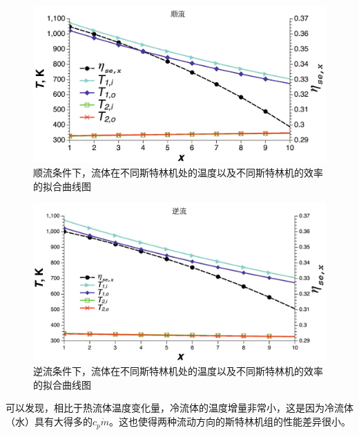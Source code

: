 \begin{figure}[hbp]
\begin{center}
	\includegraphics[width = 0.8\columnwidth]{fig/Parallelflow.pdf}
	\caption{顺流条件下，流体在不同斯特林机处的温度以及不同斯特林机的效率的拟合曲线图}
	\label{fig:Parallelflow}
\end{center}
\end{figure}

\begin{figure}[htbp]
\begin{center}
	\includegraphics[width = 0.8\columnwidth]{fig/Counterflow.pdf}
	\caption{逆流条件下，流体在不同斯特林机处的温度以及不同斯特林机的效率的拟合曲线图}
	\label{fig:Counterflow}
\end{center}
\end{figure}

可以发现，相比于热流体温度变化量，冷流体的温度增量非常小，这是因为冷流体（水）具有大得多的$c_p\dot{m}$。这也使得两种流动方向的斯特林机组的性能差异很小。

